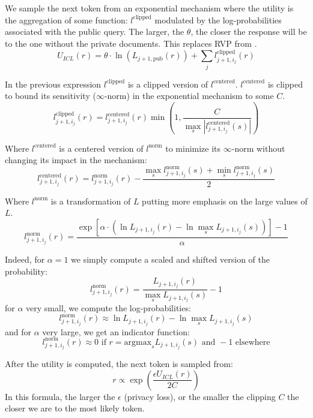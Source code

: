 \documentclass[conference]{IEEEtran}
\begin{document}
We sample the next token from an exponential mechanism where the utility
is the aggregation of some function: \(l^\text{clipped}\) modulated by
the log-probabilities associated with the public query. The larger, the
\(\theta\), the closer the response will be to the one without the
private documents. This replaces RVP from \cite{ref-tang2024privacypreservingincontextlearningdifferentially}.
\[U_{ICL}(r) = \theta \cdot \ln\left(L_{j+1, \text{pub}}(r)\right) + \sum_j l_{j+1,i_{j}}^\text{clipped}\left(r\right)\]

In the previous expression \(l^\text{clipped}\) is a clipped version of
\(l^\text{centered}\). \(l^\text{centered}\) is clipped to bound its
sensitivity (\(\infty\)-norm) in the exponential mechanism to some
\(C\).
\[l_{j+1,i_{j}}^\text{clipped}\left(r\right) = l_{j+1,i_{j}}^\text{centered}\left(r\right)\min\left(1, \frac{C}{\max_s \left|l_{j+1,i_{j}}^\text{centered}\left(s\right)\right|}\right)\]

Where \(l^\text{centered}\) is a centered version of \(l^\text{norm}\)
to minimize its \(\infty\)-norm without changing its impact in the
mechanism:
\[l_{j+1,i_{j}}^\text{centered}\left(r\right) = l_{j+1,i_{j}}^\text{norm}\left(r\right)-\frac{\max_sl_{j+1,i_{j}}^\text{norm}\left(s\right)+\min_sl_{j+1,i_{j}}^\text{norm}\left(s\right)}{2}\]

Where \(l^\text{norm}\) is a transformation of \(L\) putting more
emphasis on the large values of \(L\).
\[l_{j+1,i_{j}}^\text{norm}\left(r\right) = \frac{\exp\left[\alpha\cdot \left(\ln L_{j+1,i_{j}}\left(r\right) - \ln \max_s L_{j+1,i_{j}}\left(s\right)\right)\right]-1}{\alpha}\]

Indeed, for \(\alpha=1\) we simply compute a scaled and shifted version
of the probability:
\[l_{j+1,i_{j}}^\text{norm}\left(r\right) = \frac{L_{j+1,i_{j}}\left(r\right)}{\max_s L_{j+1,i_{j}}\left(s\right)}-1\]
for \(\alpha\) very small, we compute the log-probabilities:
\[l_{j+1,i_{j}}^\text{norm}\left(r\right) \approx \ln L_{j+1,i_{j}}\left(r\right) - \ln \max_s L_{j+1,i_{j}}\left(s\right)\]
and for \(\alpha\) very large, we get an indicator function:
\[l_{j+1,i_{j}}^\text{norm}\left(r\right) \approx 0 \text{ if } r=\text{argmax}_s L_{j+1,i_{j}}\left(s\right) \text{ and } -1 \text{ elsewhere}\]

After the utility is computed, the next token is sampled from:
\[r\propto \exp{\left(\frac{\epsilon U_{ICL}(r)}{2 C}\right)}\] In this
formula, the larger the \(\epsilon\) (privacy loss), or the smaller the
clipping \(C\) the closer we are to the most likely token.
\end{document}
